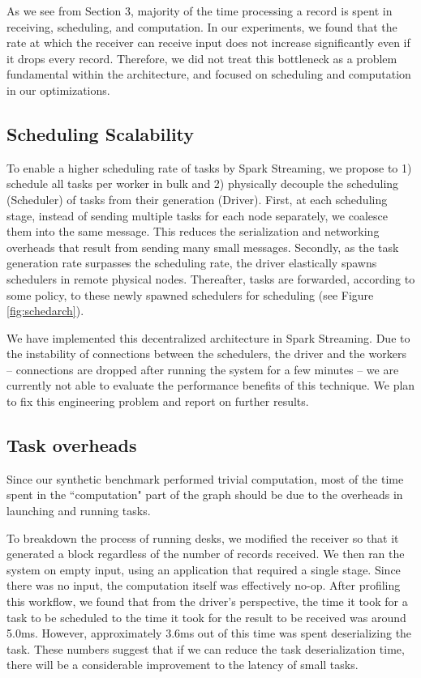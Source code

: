 As we see from Section 3, majority of the time processing a record is spent in receiving, scheduling, and computation. In our experiments, we found that the rate at which the receiver can receive input does not increase significantly even if it drops every record. Therefore, we did not treat this bottleneck as a problem fundamental within the architecture, and focused on scheduling and computation in our optimizations.

\subsection{Scheduling Scalability}

To enable a higher scheduling rate of tasks by Spark Streaming, we propose to 1) schedule all tasks per worker in bulk and 2) physically decouple the scheduling (Scheduler) of tasks from their generation (Driver).
First, at each scheduling stage, instead of sending multiple tasks for each node separately, we coalesce them into the same message. This reduces the serialization and networking overheads that result from sending many small messages.
Secondly, as the task generation rate surpasses the scheduling rate, the driver elastically spawns schedulers in remote physical nodes. Thereafter, tasks are forwarded, according to some policy, to these newly spawned schedulers for scheduling (see Figure \ref{fig:schedarch}). 

We have implemented this decentralized architecture in Spark Streaming. Due to the instability of connections between the schedulers, the driver and the workers -- connections are dropped after running the system for a few minutes -- we are currently not able to evaluate the performance benefits of this technique. We plan to fix this engineering problem and report on further results.

\subsection{Task overheads}

Since our synthetic benchmark performed trivial computation, most of the time spent in the ``computation" part of the graph should be due to the overheads in launching and running tasks. 

To breakdown the process of running desks, we modified the receiver so that it generated a block regardless of the number of records received. We then ran the system on empty input, using an application that required a single stage. Since there was no input, the computation itself was effectively no-op. After profiling this workflow, we found that from the driver's perspective, the time it took for a task to be scheduled to the time it took for the result to be received was around 5.0ms. However, approximately 3.6ms out of this time was spent deserializing the task. These numbers suggest that if we can reduce the task deserialization time, there will be a considerable improvement to the latency of small tasks.

